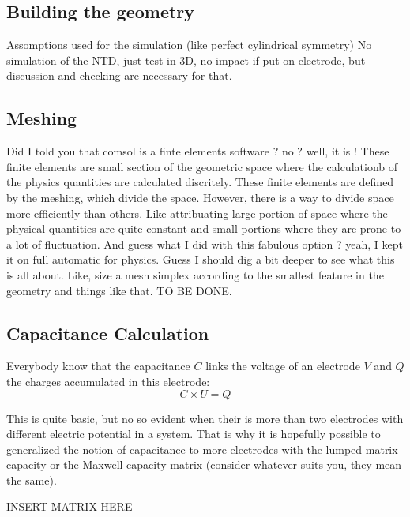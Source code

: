 \subsection{Building the geometry}

Assomptions used for the simulation (like perfect cylindrical symmetry)
No simulation of the NTD, just test in 3D, no impact if put on electrode, but discussion and checking are necessary for that.

\subsection{Meshing}

Did I told you that comsol is a finte elements software ? no ? well, it is !
These finite elements are small section of the geometric space where the calculationb of the physics quantities are calculated discritely. These finite elements are defined by the meshing, which divide the space. However, there is a way to divide space more efficiently than others. Like attribuating large portion of space where the physical quantities are quite constant and small portions where they are prone to a lot of fluctuation.
And guess what I did with this fabulous option ?
yeah, I kept it on full automatic for physics. Guess I should dig a bit deeper to see what this is all about. Like, size a mesh simplex according to the smallest feature in the geometry and things like that.
TO BE DONE.

\subsection{Capacitance Calculation}

Everybody know that the capacitance $C$ links the voltage of an electrode $V$ and $Q$ the  charges accumulated in this electrode:
\begin{equation}
C \times U = Q
\end{equation}

This is quite basic, but no so evident when their is more than two electrodes with different electric potential in a system. That is why it is hopefully possible to generalized the notion of capacitance to more electrodes with the lumped matrix capacity or the Maxwell capacity matrix (consider whatever suits you, they mean the same).

INSERT MATRIX HERE

